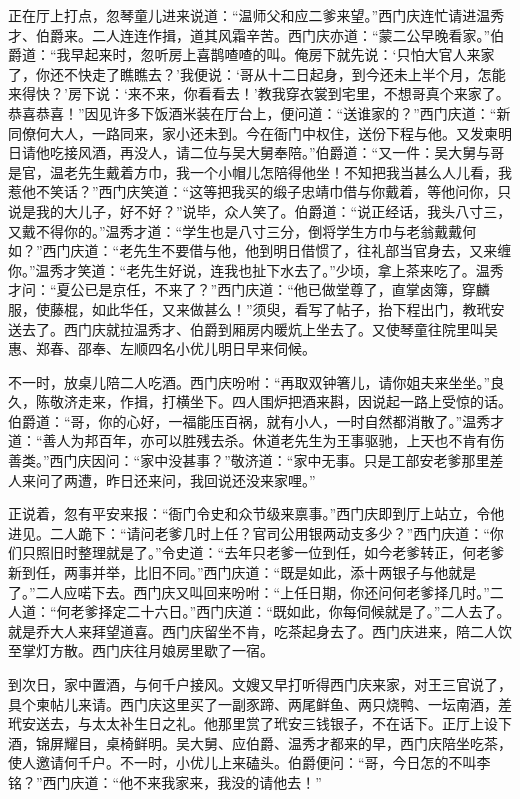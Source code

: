 正在厅上打点，忽琴童儿进来说道：“温师父和应二爹来望。”西门庆连忙请进温秀才、伯爵来。二人连连作揖，道其风霜辛苦。西门庆亦道：“蒙二公早晚看家。”伯爵道：“我早起来时，忽听房上喜鹊喳喳的叫。俺房下就先说：‘只怕大官人来家了，你还不快走了瞧瞧去？’我便说：‘哥从十二日起身，到今还未上半个月，怎能来得快？’房下说：‘来不来，你看看去！’教我穿衣裳到宅里，不想哥真个来家了。恭喜恭喜！”因见许多下饭酒米装在厅台上，便问道：“送谁家的？”西门庆道：“新同僚何大人，一路同来，家小还未到。今在衙门中权住，送份下程与他。又发柬明日请他吃接风酒，再没人，请二位与吴大舅奉陪。”伯爵道：“又一件：吴大舅与哥是官，温老先生戴着方巾，我一个小帽儿怎陪得他坐！不知把我当甚么人儿看，我惹他不笑话？”西门庆笑道：“这等把我买的缎子忠靖巾借与你戴着，等他问你，只说是我的大儿子，好不好？”说毕，众人笑了。伯爵道：“说正经话，我头八寸三，又戴不得你的。”温秀才道：“学生也是八寸三分，倒将学生方巾与老翁戴戴何如？”西门庆道：“老先生不要借与他，他到明日借惯了，往礼部当官身去，又来缠你。”温秀才笑道：“老先生好说，连我也扯下水去了。”少顷，拿上茶来吃了。温秀才问：“夏公已是京任，不来了？”西门庆道：“他已做堂尊了，直掌卤簿，穿麟服，使藤棍，如此华任，又来做甚么！”须臾，看写了帖子，抬下程出门，教玳安送去了。西门庆就拉温秀才、伯爵到厢房内暖炕上坐去了。又使琴童往院里叫吴惠、郑春、邵奉、左顺四名小优儿明日早来伺候。

不一时，放桌儿陪二人吃酒。西门庆吩咐：“再取双钟箸儿，请你姐夫来坐坐。”良久，陈敬济走来，作揖，打横坐下。四人围炉把酒来斟，因说起一路上受惊的话。伯爵道：“哥，你的心好，一福能压百祸，就有小人，一时自然都消散了。”温秀才道：“善人为邦百年，亦可以胜残去杀。休道老先生为王事驱驰，上天也不肯有伤善类。”西门庆因问：“家中没甚事？”敬济道：“家中无事。只是工部安老爹那里差人来问了两遭，昨日还来问，我回说还没来家哩。”

正说着，忽有平安来报：“衙门令史和众节级来禀事。”西门庆即到厅上站立，令他进见。二人跪下：“请问老爹几时上任？官司公用银两动支多少？”西门庆道：“你们只照旧时整理就是了。”令史道：“去年只老爹一位到任，如今老爹转正，何老爹新到任，两事并举，比旧不同。”西门庆道：“既是如此，添十两银子与他就是了。”二人应喏下去。西门庆又叫回来吩咐：“上任日期，你还问何老爹择几时。”二人道：“何老爹择定二十六日。”西门庆道：“既如此，你每伺候就是了。”二人去了。就是乔大人来拜望道喜。西门庆留坐不肯，吃茶起身去了。西门庆进来，陪二人饮至掌灯方散。西门庆往月娘房里歇了一宿。

到次日，家中置酒，与何千户接风。文嫂又早打听得西门庆来家，对王三官说了，具个柬帖儿来请。西门庆这里买了一副豕蹄、两尾鲜鱼、两只烧鸭、一坛南酒，差玳安送去，与太太补生日之礼。他那里赏了玳安三钱银子，不在话下。正厅上设下酒，锦屏耀目，桌椅鲜明。吴大舅、应伯爵、温秀才都来的早，西门庆陪坐吃茶，使人邀请何千户。不一时，小优儿上来磕头。伯爵便问：“哥，今日怎的不叫李铭？”西门庆道：“他不来我家来，我没的请他去！”

